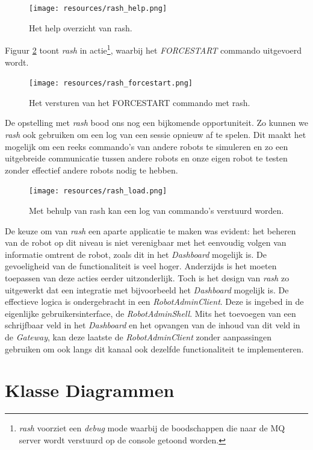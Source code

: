 \documentclass[12pt,a4paper]{report}
\begin{document}
\begin{figure}[htbp]
  \centering
  \texttt{[image: resources/rash\_help.png]}
  \caption{Het help overzicht van rash.}
  \label{fig:rash_help}
\end{figure}

Figuur \ref{fig:rash_forcestart} toont \emph{rash} in actie\footnote{\emph{rash} voorziet een \emph{debug} mode waarbij de boodschappen die naar de MQ server wordt verstuurd op de console getoond worden.}, waarbij het \emph{FORCESTART} commando uitgevoerd wordt.

\begin{figure}[htbp]
  \centering
  \texttt{[image: resources/rash\_forcestart.png]}
  \caption{Het versturen van het FORCESTART commando met rash.}
  \label{fig:rash_forcestart}
\end{figure}

De opstelling met \emph{rash} bood ons nog een bijkomende opportuniteit. Zo kunnen we \emph{rash} ook gebruiken om een log van een sessie opnieuw af te spelen. Dit maakt het mogelijk om een reeks commando's van andere robots te simuleren en zo een uitgebreide communicatie tussen andere robots en onze eigen robot te testen zonder effectief andere robots nodig te hebben.

\begin{figure}[htbp]
  \centering
  \texttt{[image: resources/rash\_load.png]}
  \caption{Met behulp van rash kan een log van commando's verstuurd worden.}
  \label{fig:rash_load}
\end{figure}

De keuze om van \emph{rash} een aparte applicatie te maken was evident: het beheren van de robot op dit niveau is niet verenigbaar met het eenvoudig volgen van informatie omtrent de robot, zoals dit in het \emph{Dashboard} mogelijk is. De gevoeligheid van de functionaliteit is veel hoger. Anderzijds is het moeten toepassen van deze acties eerder uitzonderlijk. Toch is het design van \emph{rash} zo uitgewerkt dat een integratie met bijvoorbeeld het \emph{Dashboard} mogelijk is. De effectieve logica is ondergebracht in een \emph{RobotAdminClient}. Deze is ingebed in de eigenlijke gebruikersinterface, de \emph{RobotAdminShell}. Mits het toevoegen van een schrijfbaar veld in het \emph{Dashboard} en het opvangen van de inhoud van dit veld in de \emph{Gateway}, kan deze laatste de \emph{RobotAdminClient} zonder aanpassingen gebruiken om ook langs dit kanaal ook dezelfde functionaliteit te implementeren.

\chapter{Klasse Diagrammen}
\end{document}
